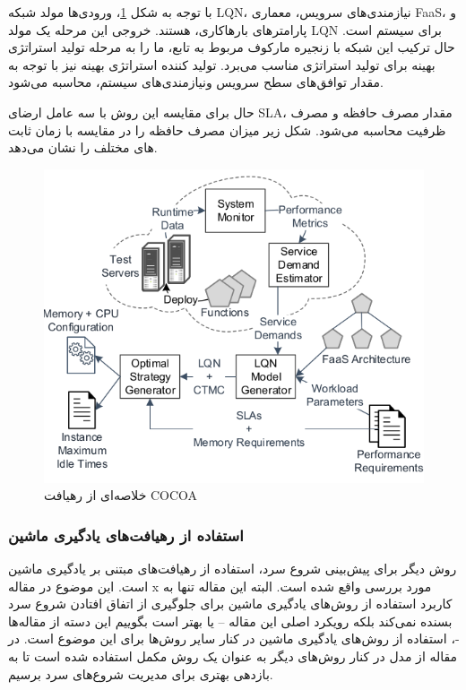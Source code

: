 با توجه به شکل \ref{fig:COCOA-overview}، ورودی‌ها مولد شبکه LQN، نیازمندی‌های سرویس، معماری FaaS، و پارامتر‌های بار‌ها‌کاری، هستند. خروجی این مرحله یک مولد LQN برای سیستم است. حال ترکیب این شبکه با زنجیره مارکوف مربوط به تابع، ما را به مرحله تولید استراتژی بهینه برای تولید استراتژی مناسب می‌برد. تولید کننده استراتژی بهینه نیز با توجه به مقدار توافق‌های سطح سرویس ونیازمندی‌های سیستم، محاسبه می‌شود. 

حال برای مقایسه این روش با  سه عامل ارضای SLA، مقدار مصرف حافظه و مصرف ظرفیت محاسبه می‌شود. 
شکل زیر میزان مصرف حافظه را در مقایسه با زمان ثابت های مختلف را نشان می‌دهد. 

\begin{figure}
	\centering
	\includegraphics[width=0.7\linewidth]{figs/COCOA-overview}
	\caption {خلاصه‌ای از رهیافت COCOA}
	\label{fig:COCOA-overview}
\end{figure}



\subsubsection{استفاده از رهیافت‌های یادگیری ماشین}

روش دیگر برای پیش‌بینی شروع سرد، استفاده‌ از رهیافت‌های مبتنی بر یادگیری ماشین است. این موضوع در مقاله x مورد بررسی واقع شده است. البته این مقاله تنها به کاربرد استفاده از روش‌های یادگیری ماشین برای جلوگیری از اتفاق افتادن شروع سرد بسنده نمی‌کند بلکه رویکرد اصلی این مقاله – یا بهتر است بگوییم این دسته از مقاله‌ها -، استفاده از روش‌های یادگیری ماشین در کنار سایر روش‌ها برای این موضوع است. در مقاله \cite{shahrad2020serverless} از مدل  در کنار روش‌های دیگر به عنوان یک روش مکمل استفاده شده است تا به بازدهی بهتری برای مدیریت شروع‌های سرد برسیم. 

